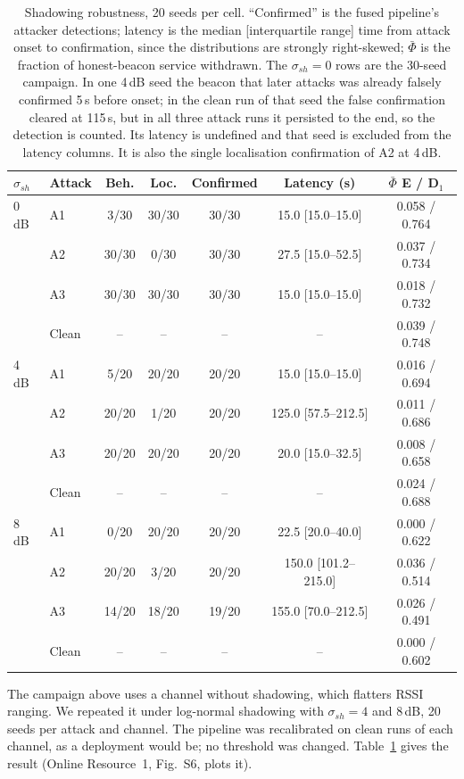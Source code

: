 \begin{table}[!t]
\caption{Shadowing robustness, 20 seeds per cell. ``Confirmed'' is the fused
pipeline's attacker detections; latency is the median [interquartile range]
time from attack onset to confirmation, since the distributions are strongly
right-skewed; $\bar\Phi$ is the fraction of honest-beacon service withdrawn.
The $\sigma_{sh} = 0$ rows are the 30-seed campaign. In one 4\,dB seed the
beacon that later attacks was already falsely confirmed 5\,s before onset; in
the clean run of that seed the false confirmation cleared at 115\,s, but in
all three attack runs it persisted to the end, so the detection is counted.
Its latency is undefined and that seed is excluded from the latency columns.
It is also the single localisation confirmation of A2 at 4\,dB.}
\label{tab:shadow}
\centering
\footnotesize
\setlength{\tabcolsep}{4pt}
\begin{tabular}{@{}llccccc@{}}
\toprule
$\sigma_{sh}$ & Attack & Beh. & Loc. & Confirmed & Latency (s) & $\bar\Phi$ E / D$_1$ \\
\midrule
0\,dB & A1 & 3/30 & 30/30 & 30/30 & 15.0 [15.0--15.0] & 0.058 / 0.764 \\
      & A2 & 30/30 & 0/30 & 30/30 & 27.5 [15.0--52.5] & 0.037 / 0.734 \\
      & A3 & 30/30 & 30/30 & 30/30 & 15.0 [15.0--15.0] & 0.018 / 0.732 \\
      & Clean & -- & -- & -- & -- & 0.039 / 0.748 \\
4\,dB & A1 & 5/20 & 20/20 & 20/20 & 15.0 [15.0--15.0] & 0.016 / 0.694 \\
      & A2 & 20/20 & 1/20 & 20/20 & 125.0 [57.5--212.5] & 0.011 / 0.686 \\
      & A3 & 20/20 & 20/20 & 20/20 & 20.0 [15.0--32.5] & 0.008 / 0.658 \\
      & Clean & -- & -- & -- & -- & 0.024 / 0.688 \\
8\,dB & A1 & 0/20 & 20/20 & 20/20 & 22.5 [20.0--40.0] & 0.000 / 0.622 \\
      & A2 & 20/20 & 3/20 & 20/20 & 150.0 [101.2--215.0] & 0.036 / 0.514 \\
      & A3 & 14/20 & 18/20 & 19/20 & 155.0 [70.0--212.5] & 0.026 / 0.491 \\
      & Clean & -- & -- & -- & -- & 0.000 / 0.602 \\
\bottomrule
\end{tabular}
\end{table}

The campaign above uses a channel without shadowing, which flatters RSSI
ranging. We repeated it under log-normal shadowing with $\sigma_{sh} = 4$ and
8\,dB, 20 seeds per attack and channel. The pipeline was recalibrated on clean
runs of each channel, as a deployment would be; no threshold was changed.
Table~\ref{tab:shadow} gives the result (Online Resource~1, Fig.~S6, plots it).

